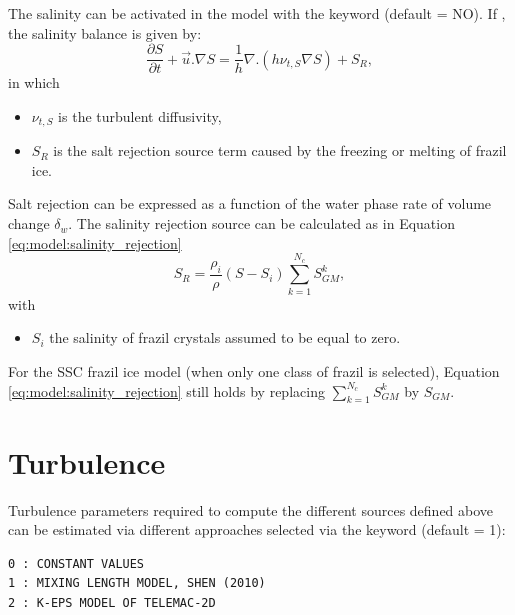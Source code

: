 The salinity can be activated in the model with the keyword  (default = NO).
If  , the salinity balance is given by:
\begin{equation}
\frac{\partial S}{\partial t} + \vec{u}. \nabla S = \dfrac{1}{h}  \nabla . \left( h \nu_{t,S} \nabla S \right)
+ S_{R} ,
\label{eq:model:salinity}
\end{equation}
in which
\begin{itemize}
	\item $\nu_{t,S}$ is the turbulent diffusivity,
	\item $S_{R}$ is the salt rejection source term caused by the freezing or melting of frazil ice.
\end{itemize}
Salt rejection can be expressed as a function of the water phase rate of volume change $\delta_w$.
The salinity rejection source can be calculated as in Equation \eqref{eq:model:salinity_rejection}
\begin{equation}
S_{R} = \frac{\rho_i}{\rho} (S-S_i) \sum_{k=1}^{N_c} S^k_{GM},
\label{eq:model:salinity_rejection}
\end{equation}
with
\begin{itemize}
	\item $S_i$ the salinity of frazil crystals assumed to be equal to zero.
\end{itemize}

For the SSC frazil ice model (when only one class of frazil is selected),
Equation \eqref{eq:model:salinity_rejection} still
holds by replacing $\sum_{k=1}^{N_c} S^k_{GM}$ by $S_{GM}$.

\section{Turbulence}
\label{turbulence}

Turbulence parameters required to compute the different sources defined above
can be estimated via different approaches selected via the keyword
 (default = 1):
\begin{lstlisting}
0 : CONSTANT VALUES
1 : MIXING LENGTH MODEL, SHEN (2010)
2 : K-EPS MODEL OF TELEMAC-2D
\end{lstlisting}

